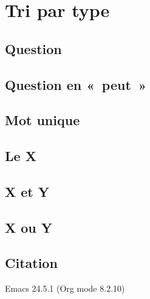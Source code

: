 \documentclass[a4paper,12pt]{article}
\begin{document}
\noindent


\section{Tri par type}
\label{sec:org59d05b4}

\subsection{Question}
\label{sec:org2eac89b}

\noindent


\subsection{Question en « peut »}
\label{sec:org5ebc87c}

\noindent


\subsection{Mot unique}
\label{sec:org8d73d18}
\noindent


\subsection{Le X}
\label{sec:orgfffd433}
\noindent


\subsection{X et Y}
\label{sec:org096e44b}

\noindent


\subsection{X ou Y}
\label{sec:org6e75ce9}

\noindent


\subsection{Citation}
\label{sec:orga0a7545}

\noindent
Emacs 24.5.1 (Org mode 8.2.10)
\end{document}
